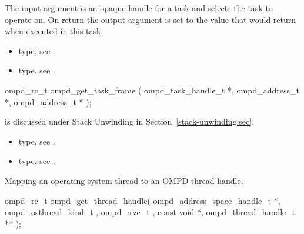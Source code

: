 \argdesc
The input argument  is an opaque handle for a task and selects the task to operate on.
On return the output argument  is set to the value that  would return when
executed in this task.

\crossreferences
\begin{itemize}
	\item {} type, see .
	\item {} type, see .
\end{itemize}



%
\label{ompd:ompd_get_task_frame}
\summary

\format
\cspecificstart
\begin{boxedcode}
ompd\_rc\_t ompd\_get\_task\_frame (
  ompd\_task\_handle\_t  *, 
  ompd\_address\_t  *,
  ompd\_address\_t *
);
\end{boxedcode}
\cspecificend



\descr
{} is discussed under Stack Unwinding in
Section~\ref{stack-unwinding:sec}.

\argdesc


\crossreferences
\begin{itemize}
	\item {} type, see .
	\item {} type, see .
\end{itemize}

\label{ompd:ompd_get_thread_handle}
\summary
Mapping an operating system thread to an OMPD thread handle.
\format
\cspecificstart
\begin{boxedcode}
ompd\_rc\_t ompd\_get\_thread\_handle(
  ompd\_address\_space\_handle\_t   *, 
  ompd\_osthread\_kind\_t           ,
  ompd\_size\_t                    , 
  const void                    *, 
  ompd\_thread\_handle\_t         **
);
\end{boxedcode}
\cspecificend

